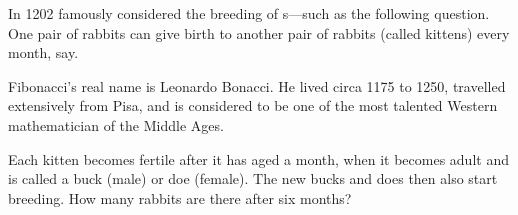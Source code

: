 \begin{example}
In 1202 
%
 famously considered the breeding of s---such as the following question.
One pair of rabbits can give birth to another pair of rabbits (called kittens) every month, say.
\begin{aside}
Fibonacci's real name is Leonardo Bonacci. 
He lived circa 1175 to 1250, travelled extensively from Pisa, and is considered to be one of the most talented Western mathematician of the Middle Ages.
\end{aside}%
Each kitten becomes fertile after it has aged a month, when it becomes adult and is called a buck (male) or doe (female).
The new bucks and does then also start breeding.
How many rabbits are there after six months?


\end{example}
